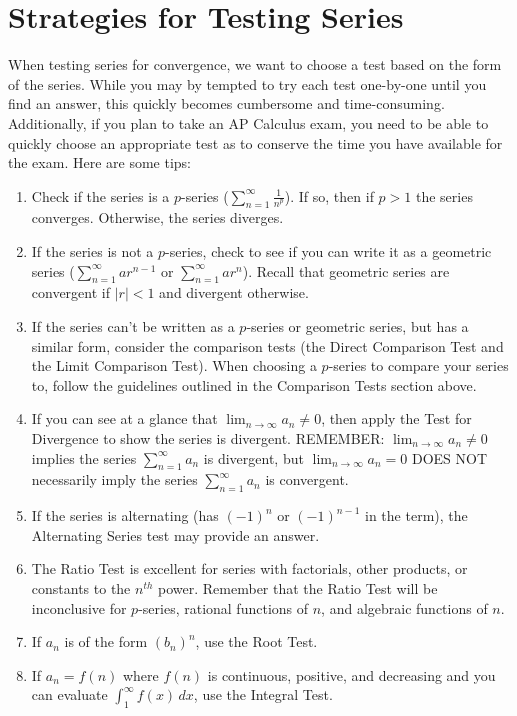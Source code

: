 \section{Strategies for Testing Series}
When testing series for convergence, we want to choose a test based on the 
form of the series. While you may by tempted to try each test one-by-one until 
you find an answer, this quickly becomes cumbersome and time-consuming. 
Additionally, if you plan to take an AP Calculus exam, you need to be able to 
quickly choose an appropriate test as to conserve the time you have available 
for the exam. Here are some tips:
\begin{enumerate}
\item Check if the series is a $p$-series ($\sum_{n=1}^\infty \frac{1}{n^p}$). 
If so, then if $p > 1$ the series converges. Otherwise, the series diverges.
\item If the series is not a $p$-series, check to see if you can write it as a 
geometric series ($\sum_{n=1}^\infty ar^{n-1}$ or $\sum_{n=1}^\infty ar^n$). 
Recall that geometric series are convergent if $|r| < 1$ and divergent otherwise.
\item If the series can't be written as a $p$-series or geometric series, but 
has a similar form, consider the comparison tests (the Direct Comparison Test 
and the Limit Comparison Test). When choosing a $p$-series to compare your 
series to, follow the guidelines outlined in the Comparison Tests section 
above. 
\item If you can see at a glance that $\lim_{n \to \infty} a_n \neq 0$, then 
apply the Test for Divergence to show the series is divergent. REMEMBER: $\lim_
{n \to \infty} a_n \neq 0$ implies the series $\sum_{n=1}^\infty a_n$ is 
divergent, but $\lim_{n \to \infty} a_n = 0$ DOES NOT necessarily imply the 
series $\sum_{n=1}^\infty a_n$ is convergent. 
\item If the series is alternating (has $(-1)^n$ or $(-1)^{n-1}$ in the term), 
the Alternating Series test may provide an answer. 
\item The Ratio Test is excellent for series with factorials, other products, 
or constants to the $n^{th}$ power. Remember that the Ratio Test will be 
inconclusive for $p$-series, rational functions of $n$, and algebraic functions 
of $n$. 
\item If $a_n$ is of the form $(b_n)^n$, use the Root Test. 
\item If $a_n = f(n)$ where $f(n)$ is continuous, positive, and decreasing and 
you can evaluate $\int_1^\infty f(x)\,dx$, use the Integral Test. 
\end{enumerate}

